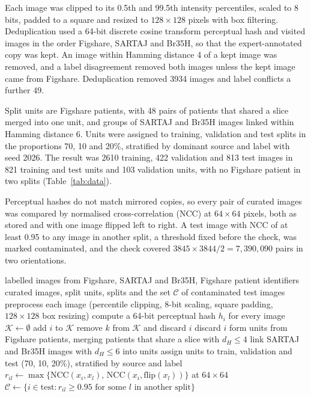 \documentclass[preprint,12pt]{elsarticle}
\begin{document}
Each image was clipped to its 0.5th and 99.5th intensity percentiles, scaled to 8 bits, padded to a square and resized
to $128\times128$ pixels with box filtering. Deduplication used a 64-bit discrete cosine transform perceptual hash and
visited images in the order Figshare, SARTAJ and Br35H, so that the expert-annotated copy was kept. An image within
Hamming distance 4 of a kept image was removed, and a label disagreement removed both images unless the kept image
came from Figshare. Deduplication removed 3934 images and label conflicts a further 49.

Split units are Figshare patients, with 48 pairs of patients that shared a slice merged into one unit, and groups of
SARTAJ and Br35H images linked within Hamming distance 6. Units were assigned to training, validation and test splits
in the proportions 70, 10 and 20\%, stratified by dominant source and label with seed 2026. The result was 2610
training, 422 validation and 813 test images in 821 training and test units and 103 validation units, with no
Figshare patient in two splits (Table~\ref{tab:data}).

Perceptual hashes do not match mirrored copies, so every pair of curated images was compared by normalised
cross-correlation (NCC) at $64\times64$ pixels, both as stored and with one image flipped left to right. A test image
with NCC of at least 0.95 to any image in another split, a threshold fixed before the check, was marked contaminated,
and the check covered $3845\times3844/2=7{,}390{,}090$ pairs in two orientations.

\begin{algorithm}[!t]
\caption{Curation and leakage control}\label{alg:curation}
\small
\begin{algorithmic}[1]
\Require labelled images from Figshare, SARTAJ and Br35H, Figshare patient identifiers
\Ensure curated images, split units, splits and the set $\mathcal{C}$ of contaminated test images
\State preprocess each image (percentile clipping, 8-bit scaling, square padding, $128\times128$ box resizing)
\State compute a 64-bit perceptual hash $h_i$ for every image
\State $\mathcal{K}\gets\emptyset$
    \State add $i$ to $\mathcal{K}$
    \State remove $k$ from $\mathcal{K}$ and discard $i$ 
  \Else
    \State discard $i$ 
  \EndIf
\EndFor
\State form units from Figshare patients, merging patients that share a slice with $d_H\le4$
\State link SARTAJ and Br35H images with $d_H\le6$ into units
\State assign units to train, validation and test (70, 10, 20\%), stratified by source and label
  \State $r_{il}\gets\max\{\mathrm{NCC}(x_i,x_l),\,\mathrm{NCC}(x_i,\mathrm{flip}(x_l))\}$ at $64\times64$
\EndFor
\State $\mathcal{C}\gets\{i \in \text{test}: r_{il}\ge0.95 \text{ for some } l \text{ in another split}\}$
\end{algorithmic}
\end{algorithm}
\end{document}
